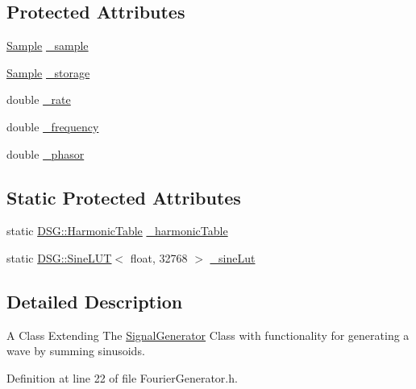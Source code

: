 \subsection*{Protected Attributes}
\begin{DoxyCompactItemize}
\item 
\hyperlink{classDSG_1_1Sample}{Sample} \hyperlink{classDSG_1_1FourierGenerator_ab96bed1cd59c42e82a689036e5c62bef}{\+\_\+sample}
\item 
\hyperlink{classDSG_1_1Sample}{Sample} \hyperlink{classDSG_1_1FourierGenerator_a6b7f2439b26914cc9df6b6975a2cedac}{\+\_\+storage}
\item 
double \hyperlink{classDSG_1_1SignalGenerator_aa10f6c85d9adee901139ea7fb346f39d}{\+\_\+rate}
\item 
double \hyperlink{classDSG_1_1SignalGenerator_a67e296e3506dcdf09402c667cddff9ac}{\+\_\+frequency}
\item 
double \hyperlink{classDSG_1_1SignalGenerator_ac2271b582bf699275f077ecb642a8cd9}{\+\_\+phasor}
\end{DoxyCompactItemize}
\subsection*{Static Protected Attributes}
\begin{DoxyCompactItemize}
\item 
static \hyperlink{classDSG_1_1HarmonicTable}{D\+S\+G\+::\+Harmonic\+Table} \hyperlink{classDSG_1_1FourierGenerator_a7288408f8e44d5edb5eecc62480243d7}{\+\_\+harmonic\+Table}
\item 
static \hyperlink{classDSG_1_1SineLUT}{D\+S\+G\+::\+Sine\+L\+U\+T}$<$ float, 32768 $>$ \hyperlink{classDSG_1_1FourierGenerator_a1ae5fb243ce05e638bdf0dec8bde7426}{\+\_\+sine\+Lut}
\end{DoxyCompactItemize}


\subsection{Detailed Description}
A Class Extending The \hyperlink{classDSG_1_1SignalGenerator}{Signal\+Generator} Class with functionality for generating a wave by summing sinusoids. 

Definition at line 22 of file Fourier\+Generator.\+h.



